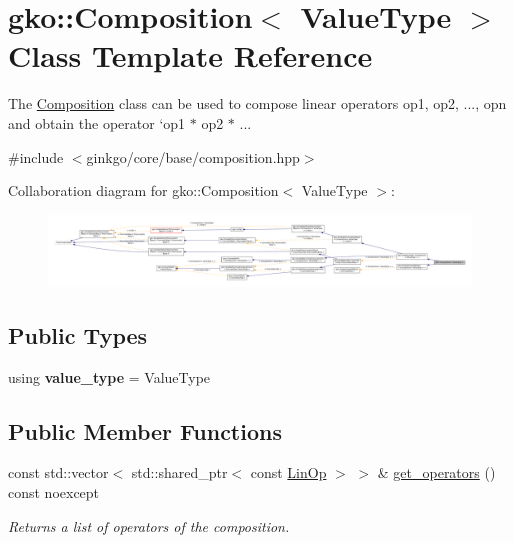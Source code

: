 \hypertarget{classgko_1_1Composition}{}\section{gko\+:\+:Composition$<$ Value\+Type $>$ Class Template Reference}
\label{classgko_1_1Composition}


The \hyperlink{classgko_1_1Composition}{Composition} class can be used to compose linear operators {\ttfamily op1, op2, ..., opn} and obtain the operator `op1 $\ast$ op2 $\ast$ ...  




{\ttfamily \#include $<$ginkgo/core/base/composition.\+hpp$>$}



Collaboration diagram for gko\+:\+:Composition$<$ Value\+Type $>$\+:
\nopagebreak
\begin{figure}[H]
\begin{center}
\leavevmode
\includegraphics[width=350pt]{classgko_1_1Composition__coll__graph}
\end{center}
\end{figure}
\subsection*{Public Types}
\begin{DoxyCompactItemize}
\item 
\mbox{\label{classgko_1_1Composition_ab565c6599fe56bf6b96f4c48f5992d6b}} 
using {\bfseries value\+\_\+type} = Value\+Type
\end{DoxyCompactItemize}
\subsection*{Public Member Functions}
\begin{DoxyCompactItemize}
\item 
const std\+::vector$<$ std\+::shared\+\_\+ptr$<$ const \hyperlink{classgko_1_1LinOp}{Lin\+Op} $>$ $>$ \& \hyperlink{classgko_1_1Composition_a196507096c635aba24e1074050827c68}{get\+\_\+operators} () const noexcept
\begin{DoxyCompactList}\small\item\em Returns a list of operators of the composition. \end{DoxyCompactList}\end{DoxyCompactItemize}
